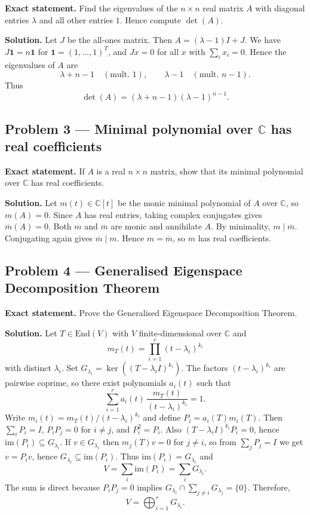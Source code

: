 \documentclass[12pt,a4paper]{article}
\theoremstyle{plain}
\theoremstyle{definition}      %
\begin{document}
\textbf{Exact statement.}
Find the eigenvalues of the $n\times n$ real matrix $A$ with diagonal entries $\lambda$ and all other entries $1$.
Hence compute $\det(A)$.

\textbf{Solution.}
Let $J$ be the all-ones matrix. Then $A=(\lambda-1)I+J$.
We have $J\mathbf 1=n\mathbf 1$ for $\mathbf 1=(1,\dots,1)^T$, and $Jx=0$ for all $x$ with $\sum_i x_i=0$.
Hence the eigenvalues of $A$ are
\[
\lambda+n-1 \quad (\text{mult. }1),\qquad \lambda-1 \quad (\text{mult. }n-1).
\]
Thus
\[
\det(A)=(\lambda+n-1)(\lambda-1)^{n-1}.
\]

\subsection*{Problem 3 — Minimal polynomial over $\mathbb C$ has real coefficients}

\textbf{Exact statement.}
If $A$ is a real $n\times n$ matrix, show that its minimal polynomial over $\mathbb C$ has real coefficients.

\textbf{Solution.}
Let $m(t)\in\mathbb C[t]$ be the monic minimal polynomial of $A$ over $\mathbb C$, so $m(A)=0$.
Since $A$ has real entries, taking complex conjugates gives $\overline{m}(A)=0$.
Both $m$ and $\overline{m}$ are monic and annihilate $A$. By minimality, $m\mid \overline{m}$.
Conjugating again gives $\overline{m}\mid m$. Hence $m=\overline{m}$, so $m$ has real coefficients.

\subsection*{Problem 4 — Generalised Eigenspace Decomposition Theorem}

\textbf{Exact statement.}
Prove the Generalised Eigenspace Decomposition Theorem.

\textbf{Solution.}
Let $T\in\mathrm{End}(V)$ with $V$ finite-dimensional over $\mathbb C$ and
\[
m_T(t)=\prod_{i=1}^r (t-\lambda_i)^{k_i}
\]
with distinct $\lambda_i$.
Set $G_{\lambda_i}=\ker((T-\lambda_i I)^{k_i})$.
The factors $(t-\lambda_i)^{k_i}$ are pairwise coprime, so there exist polynomials $a_i(t)$ such that
\[
\sum_{i=1}^r a_i(t)\,\frac{m_T(t)}{(t-\lambda_i)^{k_i}}=1.
\]
Write $m_i(t)=m_T(t)/(t-\lambda_i)^{k_i}$ and define $P_i=a_i(T)m_i(T)$.
Then $\sum_i P_i=I$, $P_iP_j=0$ for $i\neq j$, and $P_i^2=P_i$.
Also $(T-\lambda_i I)^{k_i}P_i=0$, hence $\mathrm{im}(P_i)\subseteq G_{\lambda_i}$.
If $v\in G_{\lambda_i}$ then $m_j(T)v=0$ for $j\neq i$, so from $\sum_j P_j=I$ we get $v=P_iv$, hence $G_{\lambda_i}\subseteq\mathrm{im}(P_i)$.
Thus $\mathrm{im}(P_i)=G_{\lambda_i}$ and
\[
V=\sum_i \mathrm{im}(P_i)=\sum_i G_{\lambda_i}.
\]
The sum is direct because $P_iP_j=0$ implies $G_{\lambda_i}\cap\sum_{j\neq i}G_{\lambda_j}=\{0\}$.
Therefore,
\[
V=\bigoplus_{i=1}^r G_{\lambda_i}.
\]
\end{document}
